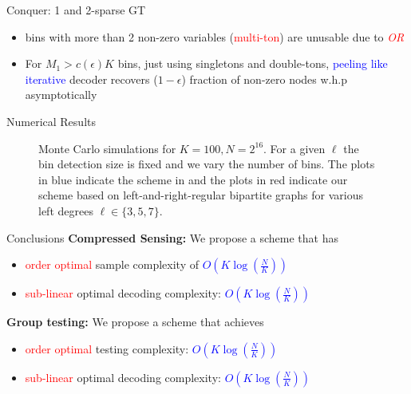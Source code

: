 \documentclass[final]{beamer}
\newlength{\threecolwid}
\newlength{\blockskip}
\newlength{\paraskip}
\begin{document}
\begin{frame}
\begin{columns}[t]
\begin{column}{\threecolwid}
\begin{block}{\Large Conquer: 1 and 2-sparse GT}
\begin{itemize}
\begin{equation*}
\begin{bmatrix}
				    \end{bmatrix}
		        \end{equation*}
		      \item bins with more than 2 non-zero variables (\textcolor{red}{multi-ton}) are unusable due to \textcolor{red}{\textit{OR}}
		      \item For $M_1>c(\epsilon)K$ bins, just using singletons and double-tons, \textcolor{blue}{peeling like iterative} decoder recovers ($1-\epsilon$) fraction of non-zero nodes w.h.p asymptotically
    	\end{itemize}
    \end{block}      

      \begin{block}{\Large Numerical Results}
		   \begin{figure}
     		  \centering
   			\scalebox{1.2}{}   
\caption{Monte Carlo simulations for $K=100, N=2^{16}$. For a given $\ell$ the bin detection size is fixed and we vary the number of bins. The plots in blue indicate the scheme in \cite{lee2015saffron} and the plots in red indicate our scheme based on left-and-right-regular bipartite graphs for various left degrees $\ell\in\{3,5,7\}$.}
			\end{figure}    
      \end{block}  
      

         \begin{alertblock}{\Large Conclusions} 
	    \textbf{Compressed Sensing:} We propose a scheme that has
			\begin{itemize}
			\itemsep10pt
				\item \textcolor{red}{order optimal} sample complexity of \textcolor{blue}{$O(K\log (\frac{N}{K}))$}
				\item \textcolor{red}{sub-linear} optimal decoding complexity: \textcolor{blue}{$O(K\log (\frac{N}{K}))$}
			\end{itemize} 
\vspace{\paraskip}    
  
   \textbf{Group testing:} We propose a scheme that achieves
		\begin{itemize}
		\itemsep10pt
			\item \textcolor{red}{order optimal} testing complexity: \textcolor{blue}{$O(K\log (\frac{N}{K}))$}
			\item \textcolor{red}{sub-linear} optimal decoding complexity: \textcolor{blue}{$O(K\log (\frac{N}{K}))$}
		\end{itemize} 
    \end{alertblock}
\vspace{-\paraskip}    


\end{column}
\end{columns}
\end{frame}
\end{document}
